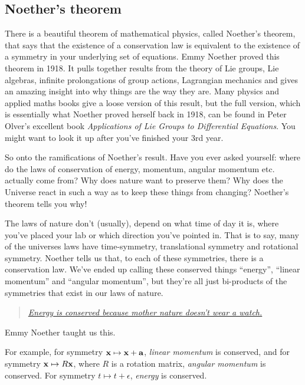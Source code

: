 \subsection{Noether's theorem}
There is a beautiful theorem of mathematical physics, called Noether’s theorem, that says that the existence of a conservation law is equivalent to the existence of a symmetry in your underlying set of equations. Emmy Noether proved this theorem in 1918. It pulls together results from the theory of Lie groups, Lie algebras, infinite prolongations of group actions, Lagrangian mechanics and gives an amazing insight into why things are the way they are. Many physics and applied maths books give a loose version of this result, but the full version, which is essentially what Noether proved herself back in 1918, can be found in Peter Olver’s excellent
book \textit{Applications of Lie Groups to Differential Equations}. You might want to look it up after you’ve finished your 3rd year. 

So onto the ramifications of Noether’s result. Have you ever asked yourself: where do
the laws of conservation of energy, momentum, angular momentum etc. actually come from? Why does nature want to preserve them? Why does the Universe react in such a way as to keep these things from changing? Noether’s theorem tells you why! 

The laws of nature don’t (usually), depend on what time of day it is, where you’ve placed your lab or which direction you’ve pointed in. That is to say, many of the universes laws have time-symmetry, translational symmetry and rotational symmetry. Noether tells
us that, to each of these symmetries, there is a conservation law. We’ve ended up calling these conserved things “energy”, “linear momentum” and “angular momentum”, but they’re all just bi-products of the symmetries that exist in our laws of nature. 
\begin{quote}
    \href{https://en.wikipedia.org/wiki/Noether\%27s_theorem}{\textit{Energy is conserved because mother nature doesn’t wear a watch.}}
\end{quote}
Emmy Noether taught us this.

For example, for symmetry $ {\bf x} \mapsto {\bf x}+{\bf a} $, \textit{linear momentum} is conserved, and for symmetry $ {\bf x} \mapsto R{\bf x} $, where $R$ is a rotation matrix, \textit{angular momentum }is conserved. For symmetry $ t \mapsto t+\epsilon $, \textit{energy} is conserved.

